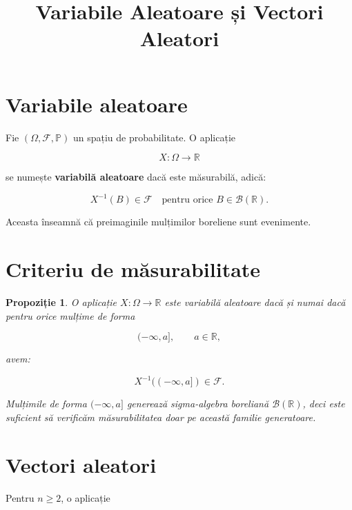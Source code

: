 \documentclass[12pt]{article}
\title{Variabile Aleatoare și Vectori Aleatori}
\author{}
\date{}
\theoremstyle{plain}
\newtheorem{proposition}{Propoziție}
\begin{document}
\maketitle

\section{Variabile aleatoare}

Fie $(\Omega, \mathcal{F}, \mathbb{P})$ un spațiu de probabilitate.
O aplicație



\[
X : \Omega \to \mathbb{R}
\]



se numește \textbf{variabilă aleatoare} dacă este măsurabilă, adică:



\[
X^{-1}(B) \in \mathcal{F}
\quad \text{pentru orice } B \in \mathcal{B}(\mathbb{R}).
\]



Aceasta înseamnă că preimaginile mulțimilor boreliene sunt evenimente.

\section{Criteriu de măsurabilitate}

\begin{proposition}
O aplicație $X : \Omega \to \mathbb{R}$ este variabilă aleatoare dacă și numai dacă
pentru orice mulțime de forma



\[
(-\infty, a], \qquad a \in \mathbb{R},
\]



avem:



\[
X^{-1}((-\infty, a]) \in \mathcal{F}.
\]



Mulțimile de forma $(-\infty, a]$ generează sigma-algebra boreliană
$\mathcal{B}(\mathbb{R})$, deci este suficient să verificăm măsurabilitatea
doar pe această familie generatoare.
\end{proposition}

\section{Vectori aleatori}

Pentru $n \ge 2$, o aplicație
\end{document}
